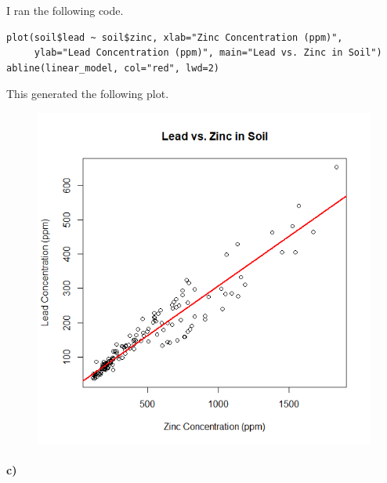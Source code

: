 \documentclass[12pt]{article}
\begin{document}
I ran the following code.
\scriptsize
\begin{verbatim}
plot(soil$lead ~ soil$zinc, xlab="Zinc Concentration (ppm)",
     ylab="Lead Concentration (ppm)", main="Lead vs. Zinc in Soil")
abline(linear_model, col="red", lwd=2)
\end{verbatim}
\normalsize
This generated the following plot.
\begin{figure}[H]
    \begin{center}
        \includegraphics[width=4.5in]{exercise1b.png}
    \end{center}
\end{figure}

\paragraph{c)}
\end{document}
